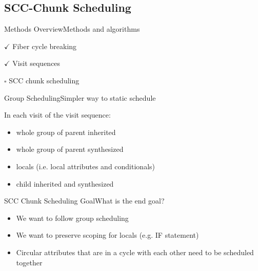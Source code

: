 \subsection*{SCC-Chunk Scheduling}{}

\begin{frame}{Methods Overview}{Methods and algorithms}
     \begin{description}
        \item $\checkmark$ Fiber cycle breaking
        \item $\checkmark$  Visit sequences
        \item $\square$  \alert{SCC chunk scheduling}
    \end{description}
\end{frame}



\begin{frame}{Group Scheduling}{Simpler way to static schedule}

In each visit of the visit sequence:
\begin{itemize}
    \item whole group of parent inherited
    \item whole group of parent synthesized
    \item locals (i.e. local attributes and conditionals)
    \item child inherited and synthesized
\end{itemize}
\end{frame}



\begin{frame}{SCC Chunk Scheduling Goal}{What is the end goal?}
    \begin{itemize}
        \item We want to follow group scheduling
        \item We want to preserve scoping for locals (e.g. IF statement)
        \item Circular attributes that are in a cycle with each other need to be scheduled together
    \end{itemize}
\end{frame}

